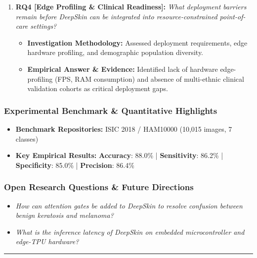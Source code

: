\begin{enumerate}[label=\textbf{\arabic*.}, leftmargin=*]
\begin{itemize}[leftmargin=1.5em]
  \end{itemize}
  \item \textbf{RQ4 [Edge Profiling \& Clinical Readiness]:} \textit{What deployment barriers remain before DeepSkin can be integrated into resource-constrained point-of-care settings?}
  \begin{itemize}[leftmargin=1.5em]
    \item \textbf{Investigation Methodology:} Assessed deployment requirements, edge hardware profiling, and demographic population diversity.
    \item \textbf{Empirical Answer \& Evidence:} Identified lack of hardware edge-profiling (FPS, RAM consumption) and absence of multi-ethnic clinical validation cohorts as critical deployment gaps.
  \end{itemize}
\end{enumerate}

\subsubsection*{Experimental Benchmark \& Quantitative Highlights}
\begin{itemize}[leftmargin=*]
  \item \textbf{Benchmark Repositories:} ISIC 2018 / HAM10000 (10,015 images, 7 classes)
  \item \textbf{Key Empirical Results:} \textbf{Accuracy}: 88.0\% \quad | \quad \textbf{Sensitivity}: 86.2\% \quad | \quad \textbf{Specificity}: 85.0\% \quad | \quad \textbf{Precision}: 86.4\%
\end{itemize}

\subsubsection*{Open Research Questions \& Future Directions}
\begin{itemize}[leftmargin=*]
  \item \textit{How can attention gates be added to DeepSkin to resolve confusion between benign keratosis and melanoma?}
  \item \textit{What is the inference latency of DeepSkin on embedded microcontroller and edge-TPU hardware?}
\end{itemize}
\vspace{0.8em}\hrule\vspace{1.2em}
